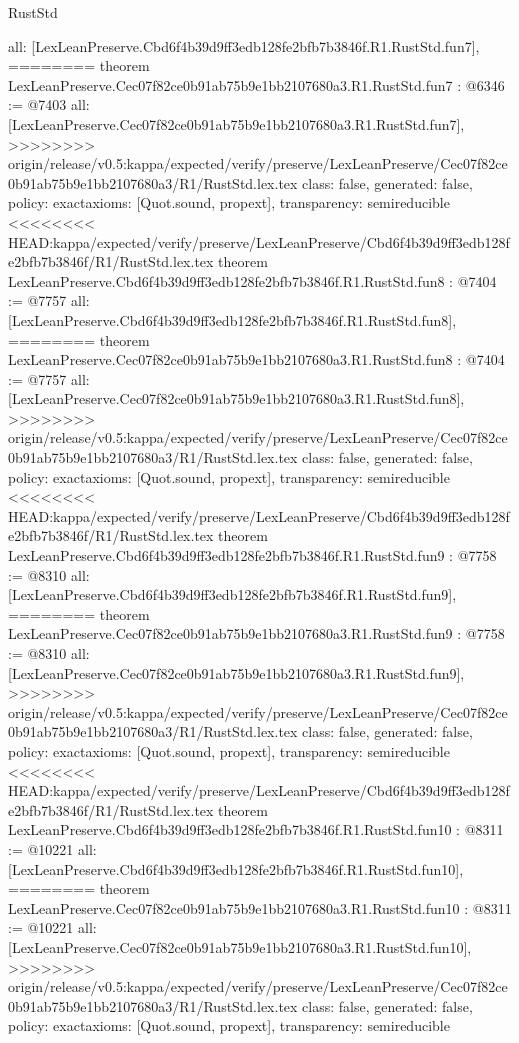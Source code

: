 \begin{lexlean}{RustStd}
\begin{coremodule}
{\begin{coremodule}
{{{{{{{{{{  all: [LexLeanPreserve.Cbd6f4b39d9ff3edb128fe2bfb7b3846f.R1.RustStd.fun7],
========
theorem LexLeanPreserve.Cec07f82ce0b91ab75b9e1bb2107680a3.R1.RustStd.fun7 : @6346 := @7403 {
  all: [LexLeanPreserve.Cec07f82ce0b91ab75b9e1bb2107680a3.R1.RustStd.fun7],
>>>>>>>> origin/release/v0.5:kappa/expected/verify/preserve/LexLeanPreserve/Cec07f82ce0b91ab75b9e1bb2107680a3/R1/RustStd.lex.tex
  class: false,
  generated: false,
  policy: exact{axioms: [Quot.sound, propext]},
  transparency: semireducible
}
<<<<<<<< HEAD:kappa/expected/verify/preserve/LexLeanPreserve/Cbd6f4b39d9ff3edb128fe2bfb7b3846f/R1/RustStd.lex.tex
theorem LexLeanPreserve.Cbd6f4b39d9ff3edb128fe2bfb7b3846f.R1.RustStd.fun8 : @7404 := @7757 {
  all: [LexLeanPreserve.Cbd6f4b39d9ff3edb128fe2bfb7b3846f.R1.RustStd.fun8],
========
theorem LexLeanPreserve.Cec07f82ce0b91ab75b9e1bb2107680a3.R1.RustStd.fun8 : @7404 := @7757 {
  all: [LexLeanPreserve.Cec07f82ce0b91ab75b9e1bb2107680a3.R1.RustStd.fun8],
>>>>>>>> origin/release/v0.5:kappa/expected/verify/preserve/LexLeanPreserve/Cec07f82ce0b91ab75b9e1bb2107680a3/R1/RustStd.lex.tex
  class: false,
  generated: false,
  policy: exact{axioms: [Quot.sound, propext]},
  transparency: semireducible
}
<<<<<<<< HEAD:kappa/expected/verify/preserve/LexLeanPreserve/Cbd6f4b39d9ff3edb128fe2bfb7b3846f/R1/RustStd.lex.tex
theorem LexLeanPreserve.Cbd6f4b39d9ff3edb128fe2bfb7b3846f.R1.RustStd.fun9 : @7758 := @8310 {
  all: [LexLeanPreserve.Cbd6f4b39d9ff3edb128fe2bfb7b3846f.R1.RustStd.fun9],
========
theorem LexLeanPreserve.Cec07f82ce0b91ab75b9e1bb2107680a3.R1.RustStd.fun9 : @7758 := @8310 {
  all: [LexLeanPreserve.Cec07f82ce0b91ab75b9e1bb2107680a3.R1.RustStd.fun9],
>>>>>>>> origin/release/v0.5:kappa/expected/verify/preserve/LexLeanPreserve/Cec07f82ce0b91ab75b9e1bb2107680a3/R1/RustStd.lex.tex
  class: false,
  generated: false,
  policy: exact{axioms: [Quot.sound, propext]},
  transparency: semireducible
}
<<<<<<<< HEAD:kappa/expected/verify/preserve/LexLeanPreserve/Cbd6f4b39d9ff3edb128fe2bfb7b3846f/R1/RustStd.lex.tex
theorem LexLeanPreserve.Cbd6f4b39d9ff3edb128fe2bfb7b3846f.R1.RustStd.fun10 : @8311 := @10221 {
  all: [LexLeanPreserve.Cbd6f4b39d9ff3edb128fe2bfb7b3846f.R1.RustStd.fun10],
========
theorem LexLeanPreserve.Cec07f82ce0b91ab75b9e1bb2107680a3.R1.RustStd.fun10 : @8311 := @10221 {
  all: [LexLeanPreserve.Cec07f82ce0b91ab75b9e1bb2107680a3.R1.RustStd.fun10],
>>>>>>>> origin/release/v0.5:kappa/expected/verify/preserve/LexLeanPreserve/Cec07f82ce0b91ab75b9e1bb2107680a3/R1/RustStd.lex.tex
  class: false,
  generated: false,
  policy: exact{axioms: [Quot.sound, propext]},
  transparency: semireducible
}}}}}}}}}}}}}}
\end{coremodule}}
\end{coremodule}
\end{lexlean}
